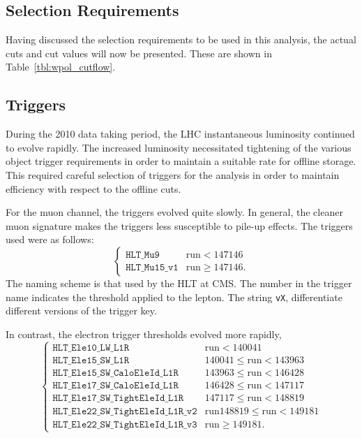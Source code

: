 \subsection{Selection Requirements}
\label{sec:wpol_cutflow}
Having discussed the selection requirements to be used in this analysis, the
actual cuts and cut values will now be presented. These are shown in
Table~\ref{tbl:wpol_cutflow}.



\subsection{Triggers}
\label{sec:wpol_triggers}
During the 2010 data taking period, the \ac{LHC} instantaneous luminosity
continued to evolve rapidly. The increased luminosity necessitated tightening of
the various object trigger requirements in order to maintain a suitable rate for
offline storage. This required careful selection of triggers for the analysis in
order to maintain efficiency with respect to the offline cuts.

For the muon channel, the triggers evolved quite slowly. In general, the cleaner
muon signature makes the triggers less susceptible to pile-up effects. The
triggers used were as follows:
\begin{equation*}
\begin{cases}
\texttt{HLT\_Mu9}          & \textrm{run} < 147146 \\
\texttt{HLT\_Mu15\_v1} & \textrm{run} \geq 147146.
\end{cases}
\end{equation*}
The naming scheme is that used by the \ac{HLT} at \ac{CMS}. The number in the
trigger name indicates the \Pt threshold applied to the lepton. The string
\texttt{vX}, differentiate different versions of the trigger key.

In contrast, the electron trigger thresholds evolved more rapidly,
\begin{equation*}
\begin{cases}
  \texttt{HLT\_Ele10\_LW\_L1R} & \textrm{run} < 140041 \\
  \texttt{HLT\_Ele15\_SW\_L1R} & 140041 \leq \textrm{run} < 143963 \\
  \texttt{HLT\_Ele15\_SW\_CaloEleId\_L1R} & 143963 \leq \textrm{run} < 146428 \\
  \texttt{HLT\_Ele17\_SW\_CaloEleId\_L1R} & 146428 \leq \textrm{run} < 147117 \\
  \texttt{HLT\_Ele17\_SW\_TightEleId\_L1R} & 147117 \leq \textrm{run} < 148819 \\
  \texttt{HLT\_Ele22\_SW\_TightEleId\_L1R\_v2} & \textrm{run} 148819 \leq \textrm{run} < 149181 \\
  \texttt{HLT\_Ele22\_SW\_TightEleId\_L1R\_v3} & \textrm{run} \geq 149181.
\end{cases}
\end{equation*}

